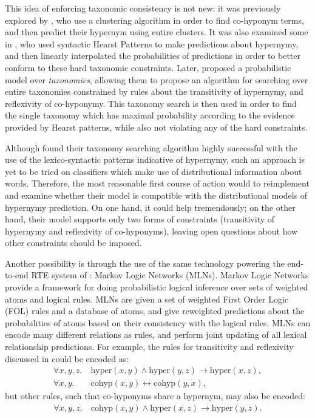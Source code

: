 \documentclass[12pt]{article}
\begin{document}
This idea of enforcing taxonomic consistency is not new: it was previously
explored by , who use a clustering algorithm in
order to find co-hyponym terms, and then predict their hypernym using entire
clusters. It was also examined some in , who used
syntactic Hearst Patterns to make predictions about hypernymy, and then
linearly interpolated the probabilities of predictions in order to better
conform to these hard taxonomic constraints. Later, 
proposed a probabilistic model over {\em taxonomies}, allowing them to propose
an algorithm for searching over entire taxonomies constrained by rules about
the transitivity of hypernymy, and reflexivity of co-hyponymy. This taxonomy
search is then used in order to find the single taxonomy which has maximal
probability according to the evidence provided by Hearst patterns, while also
not violating any of the hard constraints.

Although  found their taxonomy searching algorithm
highly successful with the use of the lexico-syntactic patterns indicative
of hypernymy, such an approach is yet to be tried on classifiers which make
use of distributional information about words. Therefore, the most reasonable
first course of action would to reimplement and examine whether their model
is compatible with the distributional models of hypernymy prediction. On one
hand, it could help tremendously; on the other hand, their model supports only
two forms of constraints (transitivity of hypernymy and reflexivity of
co-hyponyms), leaving open questions about how other constraints should be
imposed.

Another possibility is through the use of the same technology powering the
end-to-end RTE system of : Markov Logic Networks
(MLNs).  Markov Logic Networks provide a framework for doing probabilistic
logical inference over sets of weighted atoms and logical rules. MLNs are given
a set of weighted First Order Logic (FOL) rules and a database of atoms, and
give reweighted predictions about the probabilities of atoms based on their
consistency with the logical rules. MLNs can encode many
different relations as rules, and perform joint updating of all lexical
relationship predictions.  For example, the rules for transitivity and reflexivity
discussed in  could be encoded as:
\begin{align*}
  \forall x,y,z. &~\text{hyper}(x,y) \wedge \text{hyper}(y, z) \rightarrow \text{hyper}(x, z),\\
  \forall x,y. &~\text{cohyp}(x,y) \leftrightarrow \text{cohyp}(y,x),
\end{align*}
but other rules, such that co-hyponyms share a hypernym, may also be encoded:
\begin{align*}
  \forall x,y,z. &~\text{cohyp}(x,y) \wedge \text{hyper}(x,z) \rightarrow \text{hyper}(y,z).
\end{align*}
\end{document}
